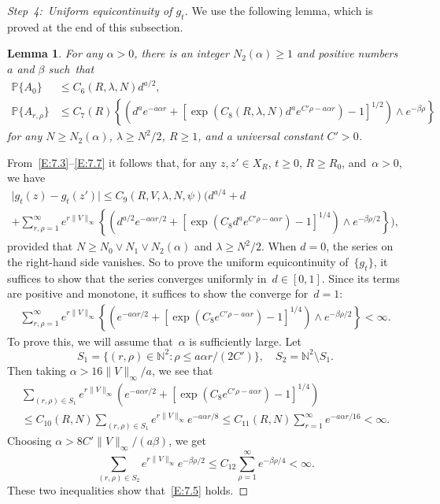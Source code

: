 \documentclass[10pt]{amsart}
\newtheorem{lemm}[theo]{Lemma}\newtheorem{prop}[theo]{Proposition}\newtheorem{coro}[theo]{Corollary}\newtheorem{conj}[theo]{Conjecture}
\theoremstyle{definition}\newtheorem{defi}[theo]{Definition}\newtheorem{rema}[theo]{Remark}\newtheorem{exam}[theo]{Example}\newtheorem{exem}[theo]{Example}\newtheorem{nota}[theo]{Notation}
\newcommand{\N}{{\mathbb N}}
\newcommand{\pP}{{\mathbb P}}
\newcommand{\la}{\lambda}
\newcommand{\ty}{\infty}
\newenvironment{step}{\begin{proof}}{\let\qed\relax \end{proof}}
\begin{document}
\begin{step}[Step~4:~Uniform equicontinuity of $g_t$]
We use the following lemma, which is proved at the end of this subsection.

\begin{lemm}\label{L:4.3PR}
For any $\alpha>0$,
there is an integer $N_2(\alpha)\ge1$ and positive numbers $a$ and $\beta$ such~that
\begin{align}
\pP\{A_{0}\} &\le C_6(R,\la, N)d^{a/2},\label{E:7.7ffd}\\
\pP\{A_{r,\rho}\} &\le C_7(R) \!\left\{ \left(d^ae^{-a\alpha r} \!+\! \left[\exp \left(C_8(R,\la,N)d^a e^{ C'\rho-a\alpha r} \right) \!-\!1\right]^{1/2} \!\right) \!\wedge \! e^{-\beta\rho} \right\} \label{E:7.7}
\end{align}
for any $N\ge N_2(\alpha)$, $\la\ge N^2/2 $, $R\ge1$, and a universal constant $C'>0$.
\end{lemm}

From~\eqref{E:7.3}--\eqref{E:7.7} it follows that, for any $z,z'\in X_R$, $t\ge0$, $R\ge R_0$, and~$\alpha>0$, we have
\begin{multline*}
\bigl|g_t(z)-g_t(z')\bigr|\le C_{9}(R,V,\la,N, \psi) \Bigg(d^{a/4} + d \\
+ \sum_{r,\rho=1}^\infty \!\! e^{r\|V\|_\infty} \! \left\{ \! \left(d^{a/2}e^{-a\alpha r/2} + \left[\exp \left(C_8d^a e^{C'\rho-a\alpha r} \! \right) -1\right]^{1/4} \right) \wedge e^{-\beta\rho/2} \right\} \!\Bigg),
\end{multline*}
provided that $N \ge N_0\vee N_1\vee N_2(\alpha) $ and $\la\ge N^2/2 $. When $d=0$, the series on the right-hand side vanishes. So to prove the uniform equicontinuity of~$\{g_t\}$, it suffices to show that the series converges uniformly in~$d\in[0,1]$. Since its terms are positive and monotone, it suffices to show the converge for~$d=1$:
\begin{align}
\sum_{r,\rho=1}^\infty e^{r\|V\|_\infty} \left\{ \left(e^{-a\alpha r/2} + \left[\exp \left(C_8 e^{C'\rho-a\alpha r} \right) -1\right]^{1/4} \right) \wedge e^{-\beta\rho/2} \right\} < \infty. \label{E:7.5}
\end{align}
To prove this, we will assume that~$\alpha$ is sufficiently large. Let
\[
S_1=\{(r,\rho)\in\N^2: \rho\le a\alpha r/(2C') \}, \quad S_2=\N^2\setminus S_1.
\]
Then taking $\alpha> 16 \|V\|_\ty/a$, we see that
\begin{multline*}
\sum_{(r,\rho)\in S_1}e^{r\|V\|_\infty} \left(e^{-a\alpha r/2} + \left[\exp \left(C_8 e^{C'\rho-a\alpha r} \right) -1\right]^{1/4} \right) \\
\le C_{10}(R,N) \sum_{(r,\rho)\in S_1} e^{r\|V\|_\infty} e^{-a\alpha r/8}\le C_{11}(R,N) \sum_{r=1}^\ty e^{-a\alpha r/16}<\infty.
\end{multline*}
Choosing $\alpha> 8C'\|V\|_\ty/(a\beta) $, we get
\[
\sum_{(r,\rho)\in S_2} e^{r\|V\|_\ty}e^{-\beta\rho/2}\le C_{12} \sum_{\rho=1}^\infty e^{-\beta\rho/4}<\infty.
\]
These two inequalities show that~\eqref{E:7.5} holds.


\end{step}
\end{document}
